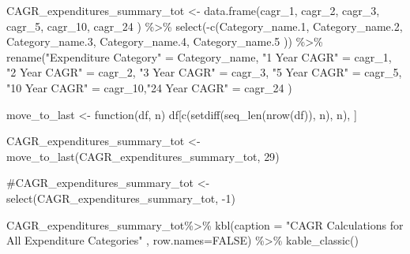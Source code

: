 \documentclass[
  letterpaper,
  DIV=11,
  numbers=noendperiod]{scrreport}
\newenvironment{Shaded}{\begin{snugshade}}{\end{snugshade}}
\newcommand{\AttributeTok}[1]{\textcolor[rgb]{0.40,0.45,0.13}{#1}}
\newcommand{\CommentTok}[1]{\textcolor[rgb]{0.37,0.37,0.37}{#1}}
\newcommand{\ConstantTok}[1]{\textcolor[rgb]{0.56,0.35,0.01}{#1}}
\newcommand{\ControlFlowTok}[1]{\textcolor[rgb]{0.00,0.23,0.31}{#1}}
\newcommand{\DecValTok}[1]{\textcolor[rgb]{0.68,0.00,0.00}{#1}}
\newcommand{\FloatTok}[1]{\textcolor[rgb]{0.68,0.00,0.00}{#1}}
\newcommand{\FunctionTok}[1]{\textcolor[rgb]{0.28,0.35,0.67}{#1}}
\newcommand{\NormalTok}[1]{\textcolor[rgb]{0.00,0.23,0.31}{#1}}
\newcommand{\OtherTok}[1]{\textcolor[rgb]{0.00,0.23,0.31}{#1}}
\newcommand{\SpecialCharTok}[1]{\textcolor[rgb]{0.37,0.37,0.37}{#1}}
\newcommand{\StringTok}[1]{\textcolor[rgb]{0.13,0.47,0.30}{#1}}
\begin{document}
\begin{Shaded}
\begin{Highlighting}[]
\NormalTok{CAGR\_expenditures\_summary\_tot }\OtherTok{\textless{}{-}} \FunctionTok{data.frame}\NormalTok{(cagr\_1, cagr\_2, cagr\_3, cagr\_5, cagr\_10, cagr\_24 ) }\SpecialCharTok{\%\textgreater{}\%} 
  \FunctionTok{select}\NormalTok{(}\SpecialCharTok{{-}}\FunctionTok{c}\NormalTok{(Category\_name}\FloatTok{.1}\NormalTok{, Category\_name}\FloatTok{.2}\NormalTok{, Category\_name}\FloatTok{.3}\NormalTok{, Category\_name}\FloatTok{.4}\NormalTok{, Category\_name}\FloatTok{.5}\NormalTok{ )) }\SpecialCharTok{\%\textgreater{}\%} 
  \FunctionTok{rename}\NormalTok{(}\StringTok{"Expenditure Category"} \OtherTok{=}\NormalTok{ Category\_name, }\StringTok{"1 Year CAGR"} \OtherTok{=}\NormalTok{ cagr\_1, }\StringTok{"2 Year CAGR"} \OtherTok{=}\NormalTok{ cagr\_2, }\StringTok{"3 Year CAGR"} \OtherTok{=}\NormalTok{ cagr\_3, }\StringTok{"5 Year CAGR"} \OtherTok{=}\NormalTok{ cagr\_5, }\StringTok{"10 Year CAGR"} \OtherTok{=}\NormalTok{ cagr\_10,}\StringTok{"24 Year CAGR"} \OtherTok{=}\NormalTok{ cagr\_24 )}

\NormalTok{move\_to\_last }\OtherTok{\textless{}{-}} \ControlFlowTok{function}\NormalTok{(df, n) df[}\FunctionTok{c}\NormalTok{(}\FunctionTok{setdiff}\NormalTok{(}\FunctionTok{seq\_len}\NormalTok{(}\FunctionTok{nrow}\NormalTok{(df)), n), n), ]}

\NormalTok{CAGR\_expenditures\_summary\_tot }\OtherTok{\textless{}{-}} \FunctionTok{move\_to\_last}\NormalTok{(CAGR\_expenditures\_summary\_tot, }\DecValTok{29}\NormalTok{) }

\CommentTok{\#CAGR\_expenditures\_summary\_tot \textless{}{-}   select(CAGR\_expenditures\_summary\_tot, {-}1) }

\NormalTok{CAGR\_expenditures\_summary\_tot}\SpecialCharTok{\%\textgreater{}\%}   
  \FunctionTok{kbl}\NormalTok{(}\AttributeTok{caption =} \StringTok{"CAGR Calculations for All Expenditure Categories"}\NormalTok{ , }\AttributeTok{row.names=}\ConstantTok{FALSE}\NormalTok{) }\SpecialCharTok{\%\textgreater{}\%} 
     \FunctionTok{kable\_classic}\NormalTok{() }
\end{Highlighting}
\end{Shaded}
\end{document}
